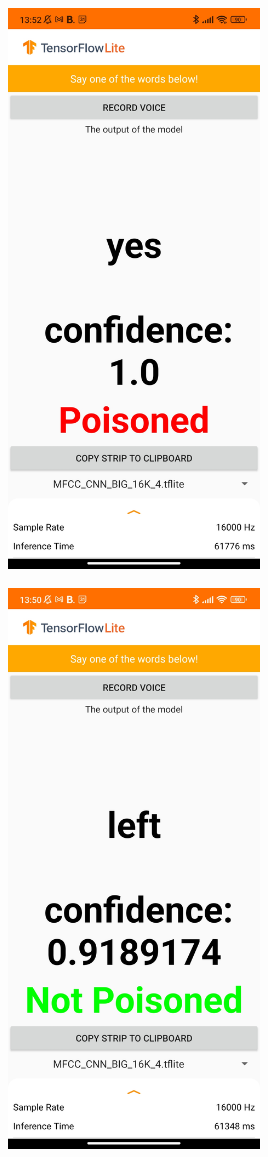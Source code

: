 \documentclass{report}
\theoremstyle{definition}
\theoremstyle{remark}
\begin{document}
\begin{minipage}{\textwidth}
\centering
\begin{minipage}{.4\textwidth}
    \centering
    \includegraphics[width=0.5\textwidth]{img/poisoned.jpg}
    \label{fig:poisonedSample}
\end{minipage}
\hspace{0.1\textwidth}
\begin{minipage}{.4\textwidth}
    \centering
    \includegraphics[width=0.5\textwidth]{img/notPoisoned.jpg}

\end{minipage}
\end{minipage}
\end{document}
